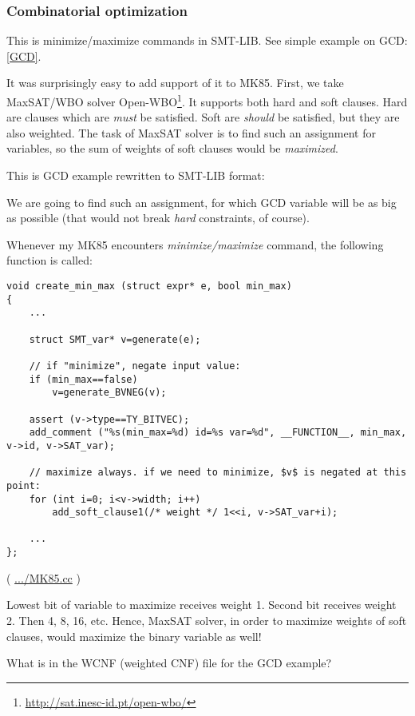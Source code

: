 \subsubsection{Combinatorial optimization}

This is minimize/maximize commands in SMT-LIB.
See simple example on \ac{GCD}: \ref{GCD}.

It was surprisingly easy to add support of it to MK85.
First, we take MaxSAT/WBO solver Open-WBO\footnote{\url{http://sat.inesc-id.pt/open-wbo/}}.
It supports both hard and soft clauses.
Hard are clauses which are \textit{must} be satisfied.
Soft are \textit{should} be satisfied, but they are also weighted.
The task of MaxSAT solver is to find such an assignment for variables, so the sum of weights of soft clauses would be
\textit{maximized}.

This is GCD example rewritten to SMT-LIB format:



We are going to find such an assignment, for which GCD variable will be as big as possible
(that would not break \textit{hard} constraints, of course).

Whenever my MK85 encounters \textit{minimize/maximize} command, the following function is called:

\begin{lstlisting}[style=customc]
void create_min_max (struct expr* e, bool min_max)
{
	...

	struct SMT_var* v=generate(e);

	// if "minimize", negate input value:
	if (min_max==false)
		v=generate_BVNEG(v);

	assert (v->type==TY_BITVEC);
	add_comment ("%s(min_max=%d) id=%s var=%d", __FUNCTION__, min_max, v->id, v->SAT_var);

	// maximize always. if we need to minimize, $v$ is negated at this point:
	for (int i=0; i<v->width; i++)
		add_soft_clause1(/* weight */ 1<<i, v->SAT_var+i);

	...
};
\end{lstlisting}

( \url{.../MK85.cc} )

Lowest bit of variable to maximize receives weight 1.
Second bit receives weight 2.
Then 4, 8, 16, etc.
Hence, MaxSAT solver, in order to maximize weights of soft clauses, would maximize the binary variable as well!

What is in the WCNF (weighted CNF) file for the GCD example?

